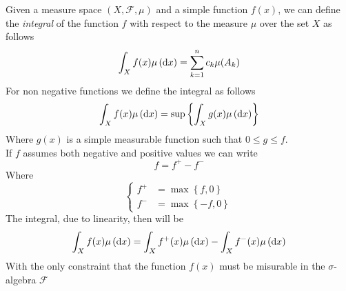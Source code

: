 \documentclass[../complete.tex]{subfiles}
\begin{document}
\begin{dfn}[Integral]
	Given a measure space $(X,\mathcal{F},\mu)$ and a simple function $f(x)$, we can define the \textit{integral} of the function $f$ with respect to the measure $\mu$ over the set $X$ as follows
	\begin{equation}
		\int_{X}^{}f(x)\mu\left( \operatorname{d\!} x \right)=\sum_{k=1}^nc_k\mu(A_k)
		\label{eq:integral}
	\end{equation}
	For non negative functions we define the integral as follows
	\begin{equation}
		\int_{X}^{}f(x)\mu\left( \operatorname{d\!} x \right)=\sup\left\{ \int_{X}^{}g(x)\mu\left( \operatorname{d\!} x \right) \right\}
		\label{eq:integralnonneg}
	\end{equation}
	Where $g(x)$ is a simple measurable function such that $0\le g\le f$.\\
	If $f$ assumes both negative and positive values we can write
	\begin{equation}
		f=f^+-f^-
		\label{eq:negposfunc}
	\end{equation}
	Where
	\begin{equation}
		\left\{ \begin{aligned}
				f^+&=\max\left\{f,0\right\}\\
				f^-&=\max\left\{-f,0\right\}
		\end{aligned}\right.
		\label{eq:f+f-lebesgue}
	\end{equation}
	The integral, due to linearity, then will be
	\begin{equation}
		\int_{X}^{}f(x)\mu\left( \operatorname{d\!} x \right)=\int_{X}^{}f^+(x)\mu\left( \operatorname{d\!} x \right)-\int_{X}^{}f^-(x)\mu\left( \operatorname{d\!} x \right)
		\label{eq:f+f-int}
	\end{equation}
	With the only constraint that the function $f(x)$ must be misurable in the $\sigma$-algebra $\mathcal{F}$
\end{dfn}
\end{document}
